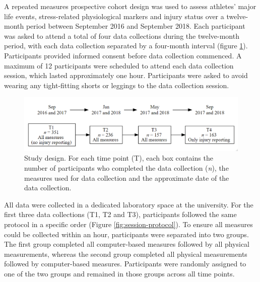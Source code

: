 \documentclass[man,floatsintext]{apa6}
\begin{document}
A repeated measures prospective cohort design was used to assess athletes' major life events, stress-related physiological markers and injury status over a twelve-month period between September 2016 and September 2018.
Each participant was asked to attend a total of four data collections during the twelve-month period, with each data collection separated by a four-month interval (figure \ref{fig:study-design}).
Participants provided informed consent before data collection commenced.
A maximum of 12 participants were scheduled to attend each data collection session, which lasted approximately one hour.
Participants were asked to avoid wearing any tight-fitting shorts or leggings to the data collection session.

\begin{figure}

{\centering \includegraphics[width=1\linewidth]{figs/study1/studydesign_new} 

}

\caption{Study design. For each time point (T), each box contains the number of participants who completed the data collection (\textit{n}), the measures used for data collection and the approximate date of the data collection.}\label{fig:study-design}
\end{figure}

All data were collected in a dedicated laboratory space at the university.
For the first three data collections (T1, T2 and T3), participants followed the same protocol in a specific order (Figure \ref{fig:session-protocol}).
To ensure all measures could be collected within an hour, participants were separated into two groups.
The first group completed all computer-based measures followed by all physical measurements, whereas the second group completed all physical measurements followed by computer-based measures.
Participants were randomly assigned to one of the two groups and remained in those groups across all time points.
\end{document}
